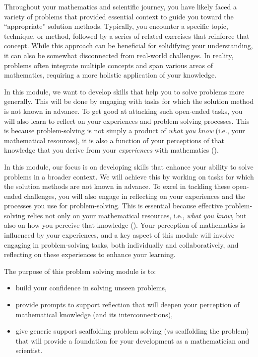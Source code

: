 \documentclass[
  a4paper,
  DIV=11,
  numbers=noendperiod,
  oneside]{scrreprt}
\providecommand{\tightlist}{%
  \setlength{\itemsep}{0pt}\setlength{\parskip}{0pt}}
\begin{document}
Throughout your mathematics and scientific journey, you have likely
faced a variety of problems that provided essential context to guide you
toward the ``appropriate'' solution methods. Typically, you encounter a
specific topic, technique, or method, followed by a series of related
exercises that reinforce that concept. While this approach can be
beneficial for solidifying your understanding, it can also be somewhat
disconnected from real-world challenges. In reality, problems often
integrate multiple concepts and span various areas of mathematics,
requiring a more holistic application of your knowledge.

In this module, we want to develop skills that help you to solve
problems more generally. This will be done by engaging with tasks for
which the solution method is not known in advance. To get good at
attacking such open-ended tasks, you will also learn to reflect on your
experiences and problem solving processes. This is because
problem-solving is not simply a product of \emph{what you know} (i.e.,
your mathematical resources), it is also a function of your perceptions
of that knowledge that you derive from your \emph{experiences} with
mathematics ().

In this module, our focus is on developing skills that enhance your
ability to solve problems in a broader context. We will achieve this by
working on tasks for which the solution methods are not known in
advance. To excel in tackling these open-ended challenges, you will also
engage in reflecting on your experiences and the processes you use for
problem-solving. This is essential because effective problem-solving
relies not only on your mathematical resources, i.e., \emph{what you
know}, but also on how you perceive that knowledge
(). Your perception of
mathematics is influenced by your experiences, and a key aspect of this
module will involve engaging in problem-solving tasks, both individually
and collaboratively, and reflecting on these experiences to enhance your
learning.

The purpose of this problem solving module is to:

\begin{itemize}
\tightlist
\item
  build your confidence in solving unseen problems,
\item
  provide prompts to support reflection that will deepen your perception
  of mathematical knowledge (and its interconnections),
\item
  give generic support scaffolding problem solving (vs scaffolding the
  problem) that will provide a foundation for your development as a
  mathematician and scientist.
\end{itemize}
\end{document}
